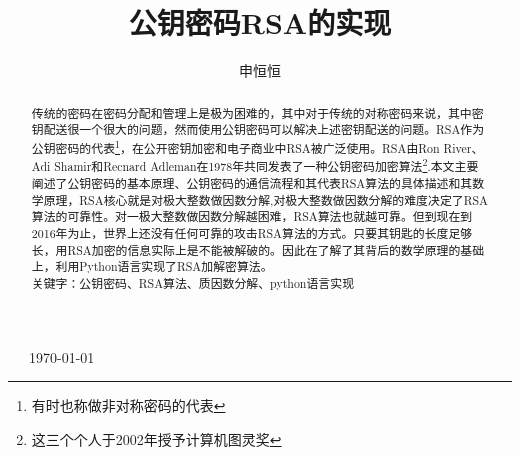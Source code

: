 \documentclass[UTF8,nofonts,cs4size]{ctexrep}
\begin{document}
\begin{titlepage}
\
\
\
{\large \today}\\[3cm] %


 

\vfill %

\end{titlepage}
\title{\Large \bf 公钥密码RSA的实现 }
 
\author{申恒恒}

\CTEXoptions[abstractname={\zihao{3}摘要}]
\begin{abstract}

传统的密码在密码分配和管理上是极为困难的，其中对于传统的对称密码来说，其中密钥配送很一个很大的问题，然而使用公钥密码可以解决上述密钥配送的问题。RSA作为公钥密码的代表\footnote{有时也称做非对称密码的代表}，在公开密钥加密和电子商业中RSA被广泛使用。RSA由Ron River、Adi Shamir和Recnard Adleman在1978年共同发表了一种公钥密码加密算法\footnote{这三个个人于2002年授予计算机图灵奖}.本文主要阐述了公钥密码的基本原理、公钥密码的通信流程和其代表RSA算法的具体描述和其数学原理，RSA核心就是对极大整数做因数分解,对极大整数做因数分解的难度决定了RSA算法的可靠性。对一极大整数做因数分解越困难，RSA算法也就越可靠。但到现在到2016年为止，世界上还没有任何可靠的攻击RSA算法的方式。只要其钥匙的长度足够长，用RSA加密的信息实际上是不能被解破的。因此在了解了其背后的数学原理的基础上，利用Python语言实现了RSA加解密算法。\\
\indent 关键字：公钥密码、RSA算法、质因数分解、python语言实现
\end{abstract}


\CTEXoptions[contentsname={\zihao{3}目\ 录}]
\tableofcontents



\end{document}
